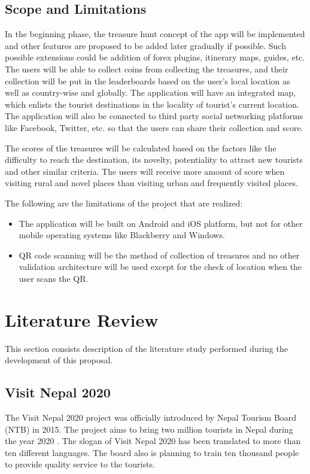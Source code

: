 \documentclass[12pt, a4paper, oneside]{article}
\begin{document}
\subsection{Scope and Limitations}
In the beginning phase, the treasure hunt concept of the app will be implemented and other features are proposed to be added later gradually if possible. Such possible extensions could be addition of forex plugins, itinerary maps, guides, etc. The users will be able to collect coins from collecting the treasures, and their collection will be put in the leaderboards based on the user's local location as well as country-wise and globally. The application will have an integrated map, which enlists the tourist destinations in the locality of tourist's current location. The application will also be connected to third party social networking platforms like Facebook, Twitter, etc. so that the users can share their collection and score. 

The scores of the treasures will be calculated based on the factors like the difficulty to reach the destination, its novelty, potentiality to attract new tourists and other similar criteria. The users will receive more amount of score when visiting rural and novel places than visiting urban and frequently visited places.

The following are the limitations of the project that are realized:
\begin{itemize}
 	\item The application will be built on Android and iOS platform, but not for other mobile operating systems like Blackberry and Windows.
	\item QR code scanning will be the method of collection of treasures and no other validation architecture will be used except for the check of location when the user scans the QR.
 \end{itemize}

\break
\section{Literature Review}
This section consists description of the literature study performed during the development of this proposal.

\subsection{Visit Nepal 2020}
The Visit Nepal 2020 project was officially introduced by Nepal Tourism Board (NTB) in 2015. The project aims to bring two million tourists in Nepal during the year 2020 \cite{visitnepal}. The slogan of Visit Nepal 2020 has been translated to more than ten different languages. The board also is planning to train ten thousand people to provide quality service to the tourists. 
\end{document}
